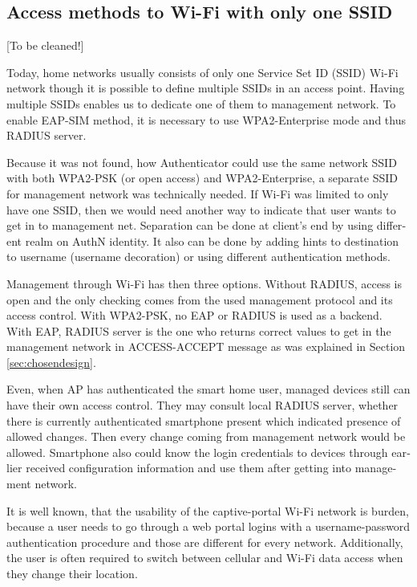 \documentclass[12pt,a4paper,english]{tutthesis}
\begin{document}
\begin{otherlanguage}{english}
\section{Access methods to Wi-Fi with only one SSID}
\label{sec-4-5}

[To be cleaned!]

Today, home networks usually consists of only one Service Set ID (SSID)
Wi-Fi network though it is possible to define multiple SSIDs in
an access point. Having multiple SSIDs enables us to dedicate one of them
to management network. 
To enable EAP-SIM method, it is necessary to use WPA2-Enterprise mode
and thus RADIUS server.


Because it was not found, how Authenticator could use the same network SSID
with both WPA2-PSK (or open access) and WPA2-Enterprise, a
separate SSID for management network was technically needed.
If Wi-Fi was limited to only have one SSID, then we would need another
way to indicate that user wants to get in to management net. 
Separation can be done at client's  end by using different realm on
AuthN identity. It also can be done by adding hints to destination to
username (username decoration) or using different authentication
methods. 

Management through Wi-Fi has then three
options.  Without RADIUS, access is open and the only checking comes
from the used management protocol and its access control.
With WPA2-PSK,  no EAP or RADIUS is used as a backend.  With EAP,
RADIUS server is the one who returns correct values to get in the
management network in ACCESS-ACCEPT message as was
explained in Section \ref{sec:chosendesign}.

Even, when AP has authenticated the smart home user, managed devices still 
can have their own access control.
They may consult local RADIUS server, whether there is currently
authenticated smartphone present which indicated presence of 
allowed changes. Then every change coming from management network
would be allowed. Smartphone also could know the login credentials to
devices through earlier received configuration information and use
them after getting into management network.







It is well known, that the usability of the captive-portal Wi-Fi
 network is burden, because a user needs to go through 
a web portal logins with a username-password authentication 
procedure and those are different for every network.
Additionally, the user is often required to switch 
between cellular and  Wi-Fi data access when they change their location.


\end{otherlanguage}
\end{document}
